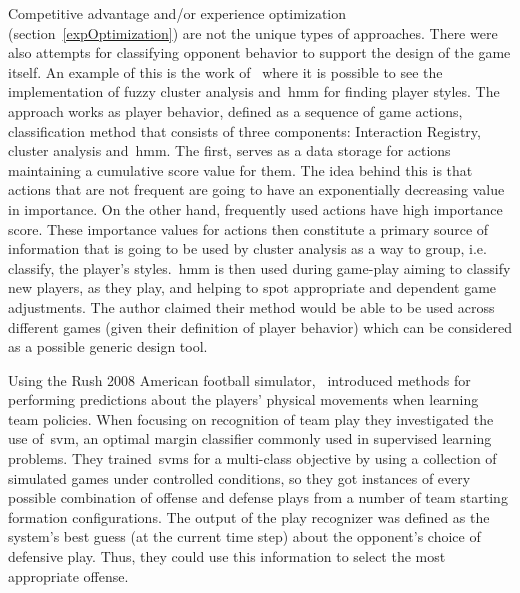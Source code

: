 Competitive advantage and/or experience optimization (section~\ref{expOptimization}) 
are not the unique types of approaches.%
There were also attempts for classifying opponent behavior to support the design of the game itself. An example of this is the work of~\cite{etheredge_generic_2013} where it is possible to see the implementation of fuzzy cluster analysis and~\gls{hmm} for finding player styles. The approach works as  player behavior, defined as a sequence of game actions, classification method that consists of three components: Interaction Registry, cluster analysis and~\gls{hmm}. The first, serves as a data storage for actions maintaining a cumulative score value for them. The idea behind this is that actions that are not frequent are going to have an exponentially decreasing value in importance. On the other hand, frequently used actions have high importance score. These importance values for actions then constitute a primary source of information that is going to be used by cluster analysis as a way to group, i.e. classify, the player's styles.~\gls{hmm} is then used during game-play aiming to classify new players, as they play, and helping to spot appropriate and dependent game adjustments. The author claimed their method would be able to be used across different games (given their definition of player behavior) which can be considered as a possible generic design tool.

Using the Rush 2008 American football simulator,~\cite{laviersa_using_2014} introduced methods for performing predictions about the players' physical movements when learning team policies. When focusing on recognition of team play they investigated the use of~\gls{svm}, an optimal margin classifier commonly used in supervised learning problems. They trained~\gls{svm}s for a multi-class objective by using a collection of simulated games under controlled conditions, so they got instances of every possible combination of offense and defense plays from a number of team starting formation configurations. The output of the play recognizer was defined as the system's best guess (at the current time step) about the opponent's choice of defensive play. Thus, they could use this information to select the most appropriate offense.

